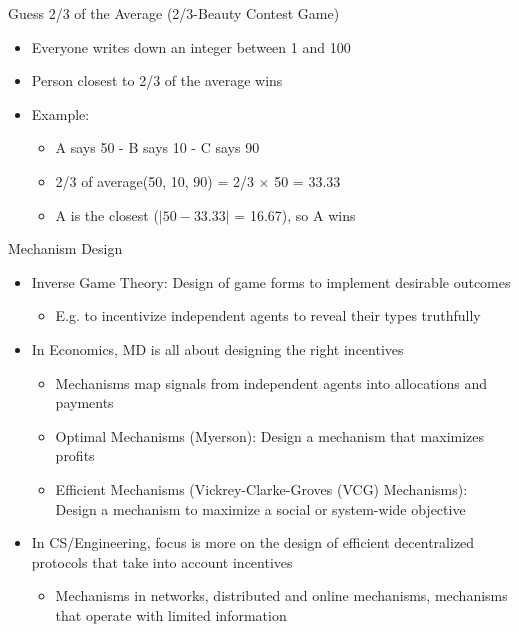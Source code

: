 \documentclass[11pt,aspectratio=169]{beamer}
\begin{document}
  \begin{frame}{Guess 2/3 of the Average (2/3-Beauty Contest Game)}
   \begin{itemize}
    \item Everyone writes down an integer between 1 and 100
    \item Person closest to 2/3 of the average wins
    \pause
    \item Example:
    \begin{itemize}
     \item A says 50 - B says 10 - C says 90
     \item 2/3 of average(50, 10, 90) = 2/3 $\times$ 50 = 33.33
     \item A is the closest ($\vert 50-33.33\vert$ = 16.67), so A wins
    \end{itemize}
   \end{itemize}
  \end{frame}
  
  \begin{frame}{Mechanism Design}
   \begin{itemize}[<+->]
   \setlength{\itemsep}{1em}
    \item {\color{blue} Inverse Game Theory}: Design of game forms to implement desirable outcomes
    \begin{itemize}[<.->]
     \item E.g. to incentivize independent agents to reveal their types truthfully
    \end{itemize}
    \item In Economics, MD is all about designing the right incentives
    \begin{itemize}[<.->]
     \item Mechanisms map \alert{signals} from independent agents into allocations and payments
     \item Optimal Mechanisms (Myerson): Design a mechanism that maximizes profits
     \item Efficient Mechanisms (Vickrey-Clarke-Groves (VCG) Mechanisms): Design a mechanism to maximize a \alert{social} or system-wide objective
    \end{itemize}
    \item In CS/Engineering, focus is more on the design of efficient decentralized protocols that take into account incentives
    \begin{itemize}[<.->]
     \item Mechanisms in networks, distributed and online mechanisms, mechanisms that operate with limited information
    \end{itemize}
   \end{itemize}
  \end{frame}
  
\end{document}
